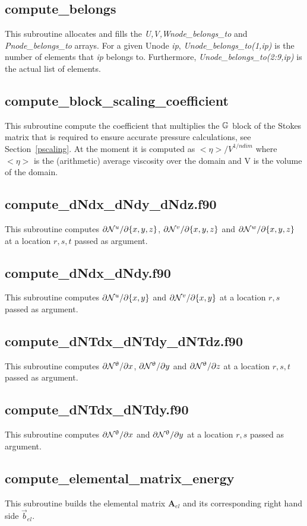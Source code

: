  \subsection{compute\_belongs}
 This subroutine allocates and fills the {\sl U,V,Wnode\_belongs\_to} and {\sl Pnode\_belongs\_to} 
 arrays. For a given Unode {\sl ip},
 {\sl Unode\_belongs\_to(1,ip)} is the number of elements that {\sl ip} belongs to.
 Furthermore, {\sl Unode\_belongs\_to(2:9,ip)} is the actual list of elements.
 \subsection{compute\_block\_scaling\_coefficient}
 This subroutine compute the coefficient that multiplies the ${\mathbb{G}}$ block of the Stokes matrix
 that is required to ensure accurate pressure calculations, see Section~\ref{pscaling}.
 At the moment it is computed as $<\eta>/{V}^{1/ndim}$ where $<\eta>$ is the (arithmetic) average 
 viscosity over the domain and V is the volume of the domain.
 \subsection{compute\_dNdx\_dNdy\_dNdz.f90}
 This subroutine computes $\partial{{\mathcal{N}}^u}/\partial \{x,y,z\}$, 
 $\partial{{\mathcal{N}}^v}/\partial \{x,y,z\}$ and
 $\partial{{\mathcal{N}}^w}/\partial \{x,y,z\}$ at a location $r,s,t$ passed as argument.
 \subsection{compute\_dNdx\_dNdy.f90}
 This subroutine computes $\partial{{\mathcal{N}}^u}/\partial \{x,y\}$ and 
 $\partial{{\mathcal{N}}^v}/\partial \{x,y\}$ at a location $r,s$ passed as argument.
 \subsection{compute\_dNTdx\_dNTdy\_dNTdz.f90}
 This subroutine computes $\partial{{\mathcal{N}}^\uptheta}/\partial x$, 
 $\partial{{\mathcal{N}}^\uptheta}/\partial y$ and
 $\partial{{\mathcal{N}}^\uptheta}/\partial z$ at a location $r,s,t$ passed as argument.
 \subsection{compute\_dNTdx\_dNTdy.f90}
 This subroutine computes $\partial{{\mathcal{N}}^\uptheta}/\partial x$ 
 and $\partial{{\mathcal{N}}^\uptheta}/\partial y$ 
 at a location $r,s$ passed as argument.
 \subsection{compute\_elemental\_matrix\_energy}
 This subroutine builds the elemental matrix ${\bm A}_{el}$ and its corresponding 
 right hand side $\vec{b}_{el}$. 
